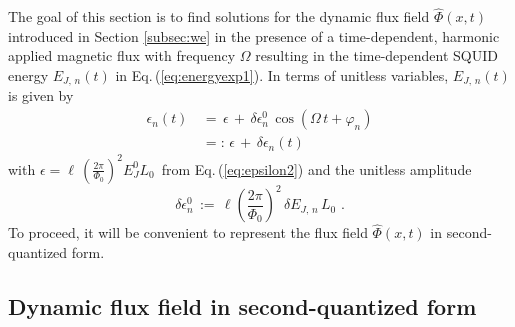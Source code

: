 \noindent
The goal of this section is to find solutions for the dynamic flux field $\hat{\Phi}(x,t)$ 
introduced in Section \ref{subsec:we} in the presence of a time-dependent, harmonic applied 
magnetic flux with frequency $\Omega$ resulting in the time-dependent SQUID energy $E_{J,\,n}(t)$ 
in Eq.\,(\ref{eq:energyexp1}). In terms of unitless variables, $E_{J,\,n}(t)$ is given by
%
\begin{equation} \label{eq:energyexp_alt}
\begin{split}
\epsilon_n(t) \, & = \, \epsilon \, + \, \delta \epsilon_n^0 \, \cos(\Omega \, t + \varphi_n) \\[2mm]
& =: \, \epsilon \, + \, \delta \epsilon_n(t) 
\end{split}
\end{equation}
%
with $\epsilon = \ell \, \displaystyle{\left(\frac{2 \pi}{\Phi_{0}}\right)^{2}} E_J^0 L_0\,$
from Eq.\,(\ref{eq:epsilon2}) and the unitless amplitude 
%
\begin{equation} \label{eq:deltaepsilon_alt}
    \delta \epsilon_n^0 \, := \, \ell \left(\frac{2 \pi}{\Phi_{0}}\right)^{2} \,
\delta E_{J,\,n} \, L_0 \, \, .
\end{equation}
%
To proceed, it will be convenient to represent the flux field $\hat{\Phi}(x,t)$
in second-quantized form.


\newpage

\subsection{Dynamic flux field in second-quantized form}
\label{subsec:sq}


